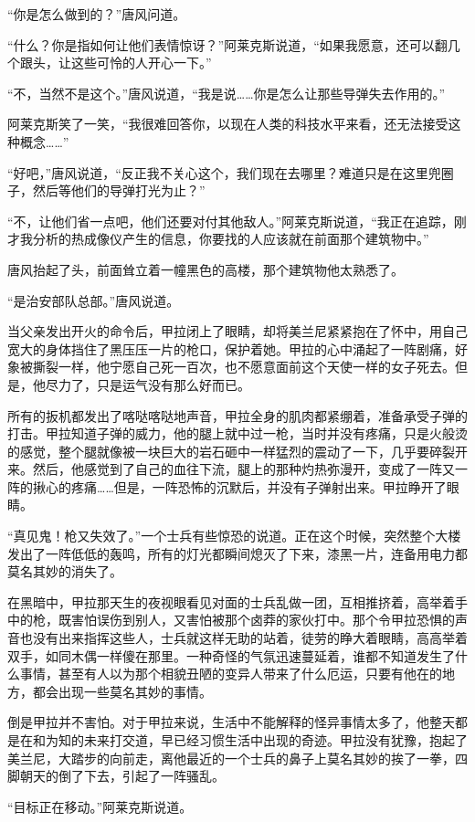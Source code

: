 “你是怎么做到的？”唐风问道。

“什么？你是指如何让他们表情惊讶？”阿莱克斯说道，“如果我愿意，还可以翻几个跟头，让这些可怜的人开心一下。”

“不，当然不是这个。”唐风说道，“我是说……你是怎么让那些导弹失去作用的。”

阿莱克斯笑了一笑，“我很难回答你，以现在人类的科技水平来看，还无法接受这种概念……”

“好吧，”唐风说道，“反正我不关心这个，我们现在去哪里？难道只是在这里兜圈子，然后等他们的导弹打光为止？”

“不，让他们省一点吧，他们还要对付其他敌人。”阿莱克斯说道，“我正在追踪，刚才我分析的热成像仪产生的信息，你要找的人应该就在前面那个建筑物中。”

唐风抬起了头，前面耸立着一幢黑色的高楼，那个建筑物他太熟悉了。

“是治安部队总部。”唐风说道。

当父亲发出开火的命令后，甲拉闭上了眼睛，却将美兰尼紧紧抱在了怀中，用自己宽大的身体挡住了黑压压一片的枪口，保护着她。甲拉的心中涌起了一阵剧痛，好象被撕裂一样，他宁愿自己死一百次，也不愿意面前这个天使一样的女子死去。但是，他尽力了，只是运气没有那么好而已。

所有的扳机都发出了喀哒喀哒地声音，甲拉全身的肌肉都紧绷着，准备承受子弹的打击。甲拉知道子弹的威力，他的腿上就中过一枪，当时并没有疼痛，只是火般烫的感觉，整个腿就像被一块巨大的岩石砸中一样猛烈的震动了一下，几乎要碎裂开来。然后，他感觉到了自己的血往下流，腿上的那种灼热弥漫开，变成了一阵又一阵的揪心的疼痛……但是，一阵恐怖的沉默后，并没有子弹射出来。甲拉睁开了眼睛。

“真见鬼！枪又失效了。”一个士兵有些惊恐的说道。正在这个时候，突然整个大楼发出了一阵低低的轰鸣，所有的灯光都瞬间熄灭了下来，漆黑一片，连备用电力都莫名其妙的消失了。

在黑暗中，甲拉那天生的夜视眼看见对面的士兵乱做一团，互相推挤着，高举着手中的枪，既害怕误伤到别人，又害怕被那个卤莽的家伙打中。那个令甲拉恐惧的声音也没有出来指挥这些人，士兵就这样无助的站着，徒劳的睁大着眼睛，高高举着双手，如同木偶一样傻在那里。一种奇怪的气氛迅速蔓延着，谁都不知道发生了什么事情，甚至有人以为那个相貌丑陋的变异人带来了什么厄运，只要有他在的地方，都会出现一些莫名其妙的事情。

倒是甲拉并不害怕。对于甲拉来说，生活中不能解释的怪异事情太多了，他整天都是在和为知的未来打交道，早已经习惯生活中出现的奇迹。甲拉没有犹豫，抱起了美兰尼，大踏步的向前走，离他最近的一个士兵的鼻子上莫名其妙的挨了一拳，四脚朝天的倒了下去，引起了一阵骚乱。

“目标正在移动。”阿莱克斯说道。

